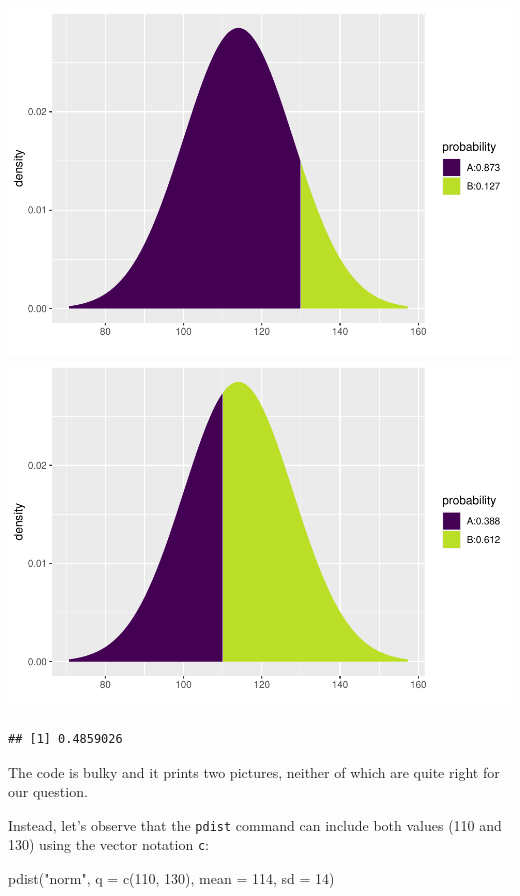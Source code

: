 \documentclass[
]{book}
\newenvironment{Shaded}{\begin{snugshade}}{\end{snugshade}}
\newcommand{\AttributeTok}[1]{\textcolor[rgb]{0.77,0.63,0.00}{#1}}
\newcommand{\DecValTok}[1]{\textcolor[rgb]{0.00,0.00,0.81}{#1}}
\newcommand{\FunctionTok}[1]{\textcolor[rgb]{0.00,0.00,0.00}{#1}}
\newcommand{\NormalTok}[1]{#1}
\newcommand{\StringTok}[1]{\textcolor[rgb]{0.31,0.60,0.02}{#1}}
\begin{document}
\includegraphics{intro_stats_files/figure-latex/unnamed-chunk-341-1.pdf} \includegraphics{intro_stats_files/figure-latex/unnamed-chunk-341-2.pdf}

\begin{verbatim}
## [1] 0.4859026
\end{verbatim}

The code is bulky and it prints two pictures, neither of which are quite right for our question.

Instead, let's observe that the \texttt{pdist} command can include both values (110 and 130) using the vector notation \texttt{c}:

\begin{Shaded}
\begin{Highlighting}[]
\FunctionTok{pdist}\NormalTok{(}\StringTok{"norm"}\NormalTok{, }\AttributeTok{q =} \FunctionTok{c}\NormalTok{(}\DecValTok{110}\NormalTok{, }\DecValTok{130}\NormalTok{), }\AttributeTok{mean =} \DecValTok{114}\NormalTok{, }\AttributeTok{sd =} \DecValTok{14}\NormalTok{)}
\end{Highlighting}
\end{Shaded}
\end{document}
